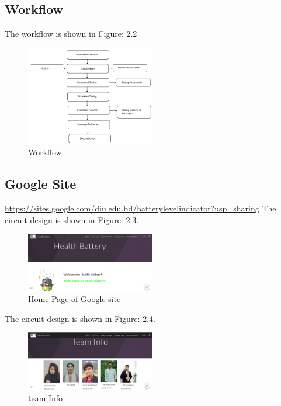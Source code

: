 \subsection{Workflow}
The workflow is shown in Figure: 2.2\newline
\begin{figure}[h] %
    \centering
    \includegraphics[width=0.5\textwidth]{workflow.png} %
    \caption{Workflow}
    \label{fig:sample}
\end{figure}




\pagebreak
\subsection{Google Site}

\url{https://sites.google.com/diu.edu.bd/batterylevelindicator?usp=sharing}
\newline 
\newline
The circuit design is shown in Figure: 2.3.\newline
\begin{figure}[h!] %
    \centering
    \includegraphics[width=0.5\textwidth]{1.png} %
    \caption{Home Page of Google site}
    \label{fig:sample}
\end{figure}
\newline

The circuit design is shown in Figure: 2.4.\newline
\begin{figure}[h!] %
    \centering
    \includegraphics[width=0.5\textwidth]{2.png} %
    \caption{team Info}
    \label{fig:sample}
\end{figure}

